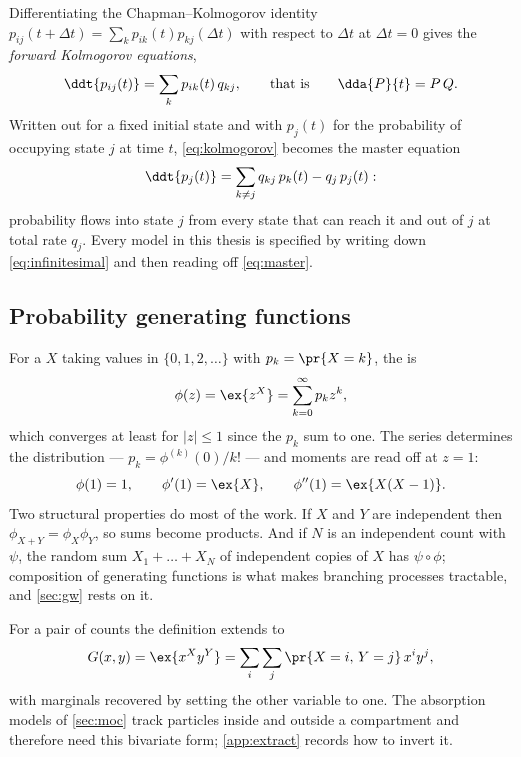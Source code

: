 Differentiating the Chapman--Kolmogorov identity
$p_{ij}(t+\Delta t) = \sum_k p_{ik}(t)p_{kj}(\Delta t)$ with respect to $\Delta t$
at $\Delta t=0$ gives the \emph{forward Kolmogorov equations},
\begin{equation}
\label{eq:kolmogorov}
\ddt{p_{ij}(t)} = \sum_{k} p_{ik}(t)\,q_{kj},
\qquad\text{that is}\qquad
\dda{P}{t} = P\,Q .
\end{equation}
Written out for a fixed initial state and with $p_j(t)$ for the probability of
occupying state $j$ at time $t$, \cref{eq:kolmogorov} becomes the master equation
\begin{equation}
\label{eq:master}
\ddt{p_j(t)} = \sum_{k\neq j}q_{kj}\,p_k(t) - q_j\,p_j(t):
\end{equation}
probability flows into state $j$ from every state that can reach it and out of $j$
at total rate $q_j$. Every model in this thesis is specified by writing down
\cref{eq:infinitesimal} and then reading off \cref{eq:master}.

\subsection{Probability generating functions}
\label{sec:pgf}

For a \rv{} $X$ taking values in $\{0,1,2,\dots\}$ with $p_k = \pr{X=k}$, the
\pgf{} is
\begin{equation}
\label{eq:pgfdef}
\phi(z) = \ex{z^X} = \sum_{k=0}^{\infty}p_k z^k ,
\end{equation}
which converges at least for $|z|\le1$ since the $p_k$ sum to one. The series
determines the distribution --- $p_k = \phi^{(k)}(0)/k!$ --- and moments are read
off at $z=1$:
\begin{equation}
\label{eq:pgfmoments}
\phi(1) = 1,
\qquad
\phi'(1) = \ex{X},
\qquad
\phi''(1) = \ex{X(X-1)} .
\end{equation}
Two structural properties do most of the work. If $X$ and $Y$ are independent then
$\phi_{X+Y} = \phi_X\phi_Y$, so sums become products. And if $N$ is an independent
count with \pgf{} $\psi$, the random sum $X_1+\dots+X_N$ of independent copies of
$X$ has \pgf{} $\psi\circ\phi$; composition of generating functions is what makes
branching processes tractable, and \cref{sec:gw} rests on it.

For a pair of counts the definition extends to
\begin{equation}
\label{eq:pgfbivariate}
G(x,y) = \ex{x^{X}y^{Y}} = \sum_{i}\sum_{j}\pr{X=i,\,Y=j}\,x^iy^j ,
\end{equation}
with marginals recovered by setting the other variable to one. The absorption
models of \cref{sec:moc} track particles inside and outside a compartment and
therefore need this bivariate form; \cref{app:extract} records how to invert it.

